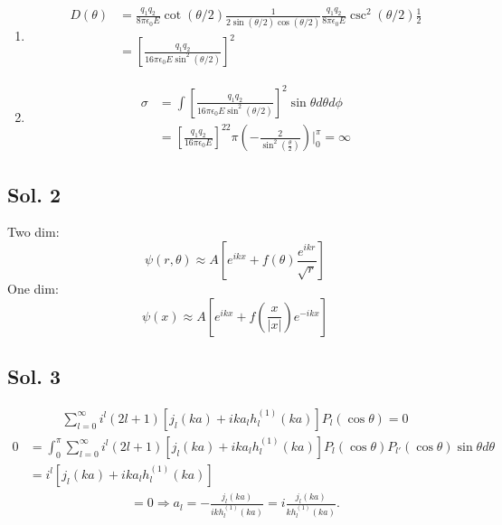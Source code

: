 \begin{enumerate}
\begin{align*}
          \end{align*}
    \item
          \begin{align*}
              D(\theta) & =
              \frac{q_1q_2}{8\pi\epsilon_0E}
              \cot(\theta/2)\frac{1}{2\sin(\theta/2)\cos(\theta/2)}
              \frac{q_1q_2}{8\pi\epsilon_0E}
              \csc^2(\theta/2)\frac{1}{2} \\
                        & =\left[
                               \frac{q_1q_2}{16\pi\epsilon_0 E\sin^2(\theta/2)}
                               \right]^2
          \end{align*}
    \item
          \begin{align*}
              \sigma & =
              \int \left[
                       \frac{q_1q_2}{16\pi\epsilon_0 E\sin^2(\theta/2)}
                       \right]^2\sin\theta d\theta d\phi \\
                     & =
              \left[
                  \frac{q_1q_2}{16\pi\epsilon_0 E}
                  \right]^22\pi
              (-\frac{2}{\sin^{2}\left(\frac{\theta}{2}\right)})\bigg|^\pi_0=\infty
          \end{align*}

\end{enumerate}
\subsection*{Sol. 2}
Two dim:
$$
    \psi(r,\theta) \approx A\left[
        e^{ikx}+f(\theta)\frac{e^{ikr}}{\sqrt{r}}
        \right]
$$
One dim:
$$
    \psi(x) \approx A\left[
        e^{ikx}+f(\frac{x}{|x|})e^{-ikx}
        \right]
$$

\subsection*{Sol. 3}
\begin{align*}
    \sum_{l=0}^\infty
    i^l(2l+1)[j_l(ka)+ika_lh_l^{(1)}(ka)]P_l(\cos\theta )=0
\end{align*}
\begin{align*}
    0 & =\int_0^{\pi}
    \sum_{l=0}^\infty
    i^l(2l+1)[j_l(ka)+ika_lh_l^{(1)}(ka)]P_l(\cos\theta )
    P_{l'}(\cos\theta)
    \sin\theta
    d\theta \\
      & =
    i^l[j_l(ka)+ika_lh_l^{(1)}(ka)]
\end{align*}
\begin{align*}
    [j_l(ka)+ika_lh_l^{(1)}(ka)]=0
    \Rightarrow
    a_l = -\frac{j_l(ka)}{ikh_l^{(1)}(ka)}
    =i\frac{j_l(ka)}{kh_l^{(1)}(ka)}.
\end{align*}
